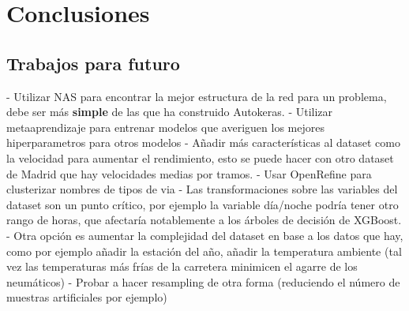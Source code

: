 
\chapter{Conclusiones}
\label{conclusiones}



\section{Trabajos para futuro}

	- Utilizar NAS para encontrar la mejor estructura de la red para un problema, debe ser más \textbf{simple} de las que ha construido Autokeras.
	- Utilizar metaaprendizaje para entrenar modelos que averiguen los mejores hiperparametros para otros modelos
	- Añadir más características al dataset como la velocidad para aumentar el rendimiento, esto se puede hacer con otro dataset de Madrid que hay velocidades medias por tramos.
	- Usar OpenRefine para clusterizar nombres de tipos de via
	- Las transformaciones sobre las variables del dataset son un punto crítico, por ejemplo la variable día/noche podría tener otro rango de horas, que afectaría notablemente a los árboles de decisión de XGBoost.
	- Otra opción es aumentar la complejidad del dataset en base a los datos que hay, como por ejemplo añadir la estación del año, añadir la temperatura ambiente (tal vez las temperaturas más frías de la carretera minimicen el agarre de los neumáticos)
	- Probar a hacer resampling de otra forma (reduciendo el número de muestras artificiales por ejemplo)